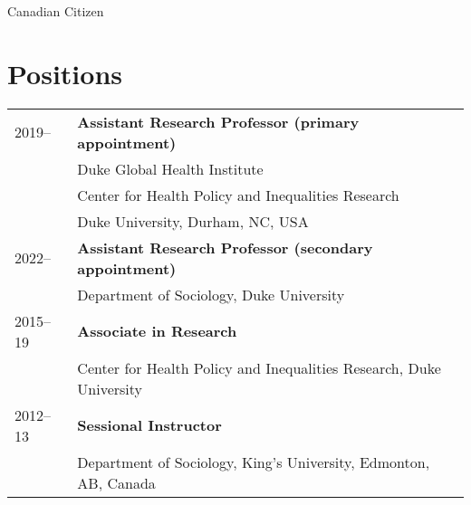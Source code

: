\vspace{1ex}
Canadian Citizen
\vspace{2ex}
\section*{Positions}
\begin{longtable}{p{} p{}}
2019-- & \textbf{Assistant Research Professor (primary appointment)}\\
		             & Duke Global Health Institute\\
		             & Center for Health Policy and Inequalities Research\\
		             &Duke University, Durham, NC, USA \\
		             
		             2022-- & \textbf{Assistant Research Professor (secondary appointment)}\\
		             & Department of Sociology, Duke University \\
		             
2015--19 & \textbf{Associate in Research}\\
& Center for Health Policy and Inequalities Research, Duke University\\

2012--13 & \textbf{Sessional Instructor}\\
& Department of Sociology, King's University, Edmonton, AB, Canada\\
\end{longtable}
